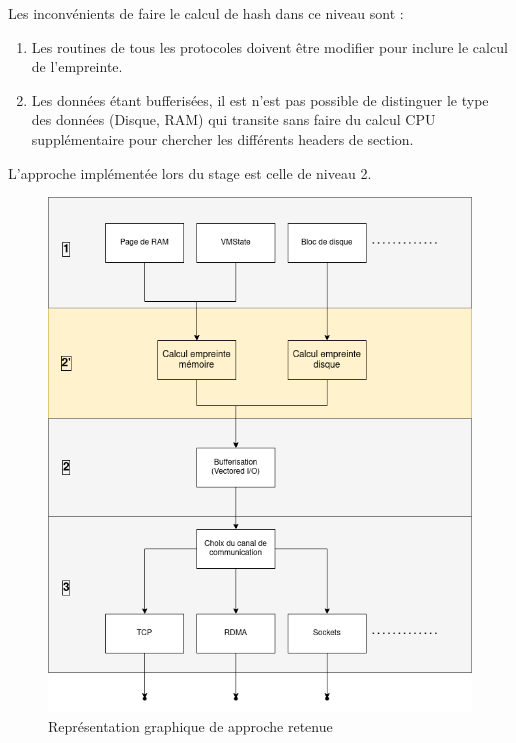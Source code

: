 \begin{description}
    Les inconvénients de faire le calcul de hash dans ce niveau sont :
    \begin{enumerate}
    \item Les routines de tous les protocoles doivent être modifier pour inclure le calcul de l'empreinte.
    \item Les données étant bufferisées, il est n'est pas possible de distinguer le type des données (Disque, RAM) qui transite sans faire du calcul CPU supplémentaire pour chercher les différents headers de section.
    \end{enumerate}
    
    \end{description}
    
    L'approche implémentée lors du stage est celle de niveau 2.
    
    \begin{figure}[H]
    \centering
    \includegraphics[scale=0.5]{include/implem.png}
    \caption{Représentation graphique de approche retenue}
    \end{figure}
    
